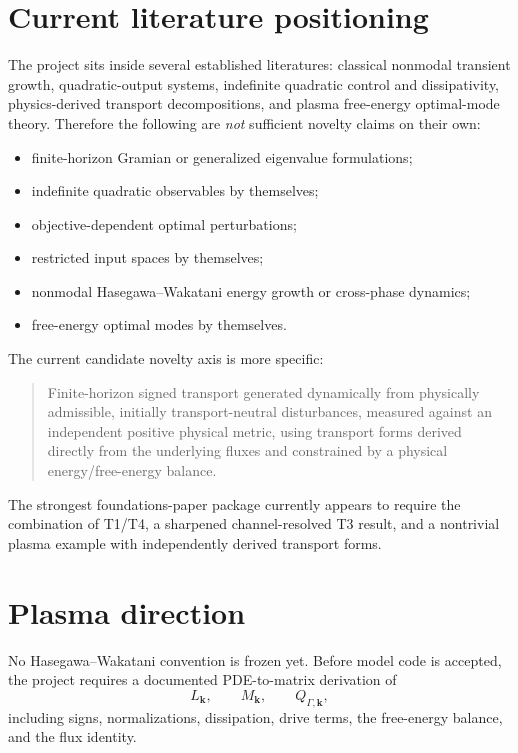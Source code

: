 \documentclass[11pt,a4paper]{article}
\begin{document}
\section{Current literature positioning}

The project sits inside several established literatures: classical nonmodal transient growth, quadratic-output systems, indefinite quadratic control and dissipativity, physics-derived transport decompositions, and plasma free-energy optimal-mode theory. Therefore the following are \emph{not} sufficient novelty claims on their own:
\begin{itemize}[leftmargin=2em]
  \item finite-horizon Gramian or generalized eigenvalue formulations;
  \item indefinite quadratic observables by themselves;
  \item objective-dependent optimal perturbations;
  \item restricted input spaces by themselves;
  \item nonmodal Hasegawa--Wakatani energy growth or cross-phase dynamics;
  \item free-energy optimal modes by themselves.
\end{itemize}

The current candidate novelty axis is more specific:
\begin{quote}
Finite-horizon signed transport generated dynamically from physically admissible, initially transport-neutral disturbances, measured against an independent positive physical metric, using transport forms derived directly from the underlying fluxes and constrained by a physical energy/free-energy balance.
\end{quote}

The strongest foundations-paper package currently appears to require the combination of T1/T4, a sharpened channel-resolved T3 result, and a nontrivial plasma example with independently derived transport forms.

\section{Plasma direction}

No Hasegawa--Wakatani convention is frozen yet. Before model code is accepted, the project requires a documented PDE-to-matrix derivation of
\begin{equation}
  L_{\bm{k}},\qquad M_{\bm{k}},\qquad Q_{\Gamma,\bm{k}},
\end{equation}
including signs, normalizations, dissipation, drive terms, the free-energy balance, and the flux identity.
\end{document}
